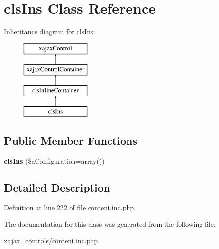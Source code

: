\hypertarget{classclsIns}{
\section{clsIns Class Reference}
\label{classclsIns}
}
Inheritance diagram for clsIns:\begin{figure}[H]
\begin{center}
\leavevmode
\includegraphics[height=4.000000cm]{classclsIns}
\end{center}
\end{figure}
\subsection*{Public Member Functions}
\begin{DoxyCompactItemize}
\item 
\hypertarget{classclsIns_a9af5593fa7172032d0da030f80b4f563}{
{\bfseries clsIns} (\$aConfiguration=array())}
\label{classclsIns_a9af5593fa7172032d0da030f80b4f563}

\end{DoxyCompactItemize}


\subsection{Detailed Description}


Definition at line 222 of file content.inc.php.



The documentation for this class was generated from the following file:\begin{DoxyCompactItemize}
\item 
xajax\_\-controls/content.inc.php\end{DoxyCompactItemize}
